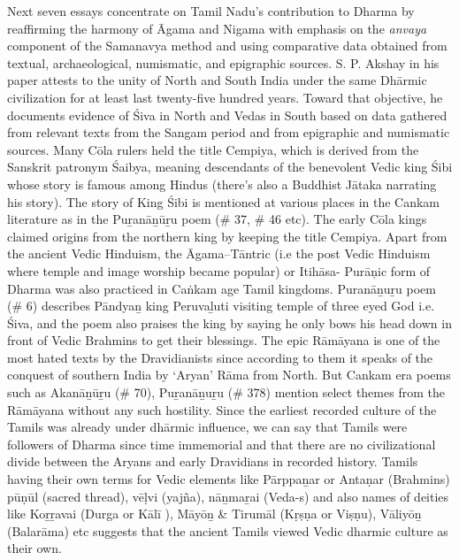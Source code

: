 Next seven essays concentrate on Tamil Nadu’s contribution to Dharma by reaffirming the harmony of Āgama and Nigama with emphasis on the \textit{anvaya} component of the Samanavya method and using comparative data obtained from textual, archaeological, numismatic, and epigraphic sources. S. P. Akshay in his paper attests to the unity of North and South India under the same Dhārmic civilization for at least last twenty-five hundred years. Toward that objective, he documents evidence of Śiva in North and Vedas in South based on data gathered from relevant texts from the Sangam period and from epigraphic and numismatic sources. Many Cōla rulers held the title Cempiya, which is derived from the Sanskrit patronym Śaibya, meaning descendants of the benevolent Vedic king Śibi whose story is famous among Hindus (there's also a Buddhist Jātaka narrating his story). The story of King Śibi is mentioned at various places in the Cankam literature as in the Puṟanāṉūṟu poem (\# 37, \# 46 etc). The early Cōla kings claimed origins from the northern king by keeping the title Cempiya. Apart from the ancient Vedic Hinduism, the Āgama--Tāntric (i.e the post Vedic Hinduism where temple and image worship became popular) or Itihāsa- Purāņic form of Dharma was also practiced in Caṅkam age Tamil kingdoms. Puranāṉuṟu poem (\# 6) describes Pāndyaṉ king Peruvaḻuti visiting temple of three eyed God i.e. Śiva, and the poem also praises the king by saying he only bows his head down in front of Vedic Brahmins to get their blessings. The epic Rāmāyana is one of the most hated texts by the Dravidianists since according to them it speaks of the conquest of southern India by ‘Aryan’ Rāma from North. But Cankam era poems such as Akanāṉūṟu (\# 70), Puṟanāṉuṟu (\# 378) mention select themes from the Rāmāyana without any such hostility. Since the earliest recorded culture of the Tamils was already under dhārmic influence, we can say that Tamils were followers of Dharma since time immemorial and that there are no civilizational divide between the Aryans and early Dravidians in recorded history. Tamils having their own terms for Vedic elements like Pārppaṉar or Antaṇar (Brahmins) pūṇūl (sacred thread), vēḷvi (yajña), nāṉmaṟai (Veda-s) and also names of deities like Koṟṟavai (Durga or Kālī ), Māyōṉ \& Tirumāl (Kṛṣṇa or Viṣṇu), Vāliyōṉ (Balarāma) etc suggests that the ancient Tamils viewed Vedic dharmic culture as their own.

